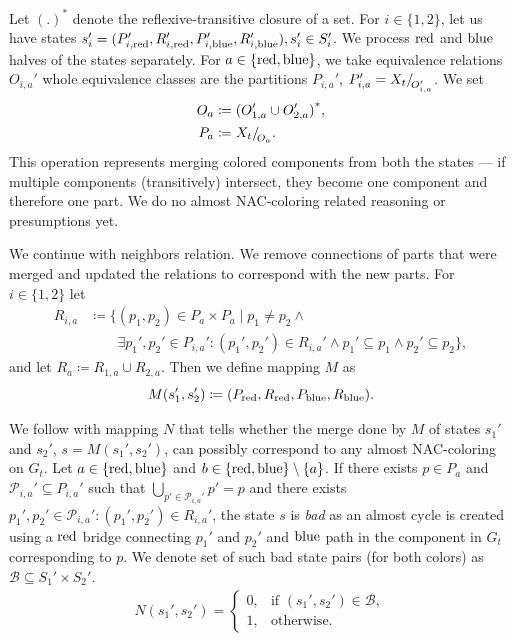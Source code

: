 Let \( {(.)}^* \) denote the reflexive-transitive closure of a set.
For \( i \in \{1, 2\} \), let us have states
\( s_i' = (P_{i,\text{red}}', R_{i,\text{red}}', P_{i,\text{blue}}', R_{i,\text{blue}}'), s_i' \in S_i' \).
%
We process \( \text{red} \) and \( \text{blue} \) halves of the states separately.
For \( a \in \{\text{red}, \text{blue}\} \),
we take equivalence relations \( O_{i, a}' \)
whole equivalence classes are the partitions \( P_{i, a}' \),
\( P_{i, a}' = X_t{/\!}_{O_{i, a}'}\).
We set
%
\begin{align*}
	O_a & \coloneqq {(O_{1, a}' \cup O_{2, a}')}^*, \\
	P_a & \coloneqq X_t{/\!}_{O_a}.
\end{align*}
%
This operation represents merging colored components from both the states
--- if multiple components (transitively) intersect, they become one
component and therefore one part.
We do no almost NAC-coloring related reasoning or presumptions yet.

We continue with neighbors relation. We remove connections of parts
that were merged and updated the relations to correspond with the new parts.
For \( i \in \{1, 2\} \) let
%
\begin{align*}
	R_{i,a} & \coloneqq \{(p_1, p_2) \in P_a \times P_a \mid p_{1} \ne p_{2} \land                                                    \\
	        & \qquad \exists p_1', p_2' \in P_{i,a}' : (p_1', p_2') \in R_{i,a}' \land p_1' \subseteq p_1 \land p_2' \subseteq p_2\},
\end{align*}
%
and let \( R_a \coloneqq R_{1,a} \cup R_{2,a} \).
Then we define mapping \( M \) as
\[ M(s_1', s_2') \coloneqq (P_{\text{red}}, R_{\text{red}}, P_{\text{blue}}, R_{\text{blue}}). \]

We follow with mapping \( N \) that tells whether the merge done by \( M \)
of states \( s_1' \) and \( s_2' \), \( s = M(s_1', s_2') \),
can possibly correspond to any almost NAC-coloring on \( G_t \).
%
Let \( a \in \{\text{red}, \text{blue} \} \) and \( b \in \{\text{red}, \text{blue} \} \setminus \{a\} \).
If there exists \( p \in P_{a} \)
and \( \mathcal{P}_{i, a}' \subseteq P_{i, a}' \) such that \( \bigcup_{p' \in \mathcal{P}_{i, a}'} p' = p \)
and there exists \( p_1', p_2' \in \mathcal{P}_{i, a}' : (p_1', p_2') \in R_{i, a}' \),
the state \( s \) is \emph{bad} as an almost cycle is created
using a \( \text{red} \) bridge connecting \( p_1' \) and \( p_2' \) and \( \text{blue} \) path
in the component in \( G_t \) corresponding to \( p \).
%
We denote set of such bad state pairs (for both colors) as \( \mathcal{B} \subseteq S_1' \times S_2' \).
%
\begin{align*}
	N(s_1', s_2') =
	\begin{cases}
		0, & \text{if } (s_1', s_2') \in \mathcal{B}, \\
		1, & \text{otherwise}.
	\end{cases}
\end{align*}
%

